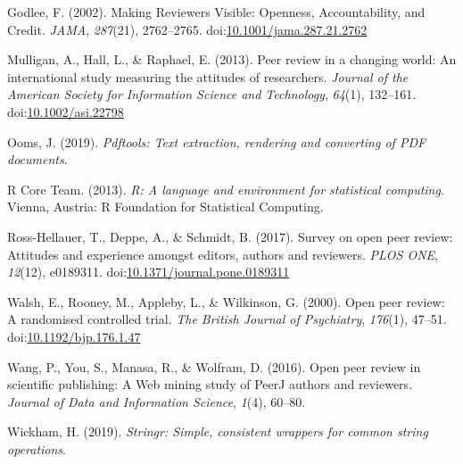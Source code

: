 \documentclass[,jou, a4paper,floatsintext]{apa6}
\begin{document}
\leavevmode\hypertarget{ref-godlee_making_2002}{}%
Godlee, F. (2002). Making Reviewers Visible: Openness, Accountability, and Credit. \emph{JAMA}, \emph{287}(21), 2762--2765. doi:\href{https://doi.org/10.1001/jama.287.21.2762}{10.1001/jama.287.21.2762}

\leavevmode\hypertarget{ref-mulligan_peer_2013}{}%
Mulligan, A., Hall, L., \& Raphael, E. (2013). Peer review in a changing world: An international study measuring the attitudes of researchers. \emph{Journal of the American Society for Information Science and Technology}, \emph{64}(1), 132--161. doi:\href{https://doi.org/10.1002/asi.22798}{10.1002/asi.22798}

\leavevmode\hypertarget{ref-ooms_pdftools_2019}{}%
Ooms, J. (2019). \emph{Pdftools: Text extraction, rendering and converting of PDF documents}.

\leavevmode\hypertarget{ref-r_core_team_r_2013}{}%
R Core Team. (2013). \emph{R: A language and environment for statistical computing}. Vienna, Austria: R Foundation for Statistical Computing.

\leavevmode\hypertarget{ref-ross-hellauer_survey_2017}{}%
Ross-Hellauer, T., Deppe, A., \& Schmidt, B. (2017). Survey on open peer review: Attitudes and experience amongst editors, authors and reviewers. \emph{PLOS ONE}, \emph{12}(12), e0189311. doi:\href{https://doi.org/10.1371/journal.pone.0189311}{10.1371/journal.pone.0189311}

\leavevmode\hypertarget{ref-walsh_open_2000}{}%
Walsh, E., Rooney, M., Appleby, L., \& Wilkinson, G. (2000). Open peer review: A randomised controlled trial. \emph{The British Journal of Psychiatry}, \emph{176}(1), 47--51. doi:\href{https://doi.org/10.1192/bjp.176.1.47}{10.1192/bjp.176.1.47}

\leavevmode\hypertarget{ref-wang_open_2016}{}%
Wang, P., You, S., Manasa, R., \& Wolfram, D. (2016). Open peer review in scientific publishing: A Web mining study of PeerJ authors and reviewers. \emph{Journal of Data and Information Science}, \emph{1}(4), 60--80.

\leavevmode\hypertarget{ref-wickham_stringr_2019}{}%
Wickham, H. (2019). \emph{Stringr: Simple, consistent wrappers for common string operations}.
\end{document}
